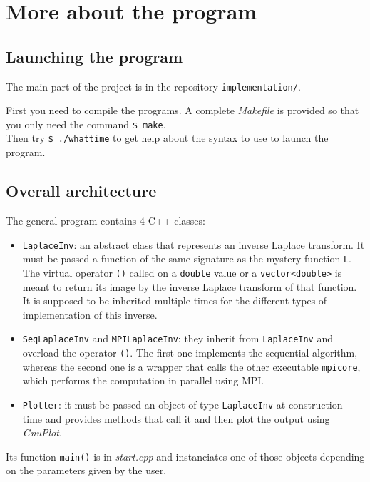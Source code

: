 \documentclass[11pt,a4paper]{article}
\begin{document}
\section*{More about the program}

\subsection*{Launching the program}

The main part of the project is in the repository \verb_implementation/_.

First you need to compile the programs. A complete \textit{Makefile} is provided so that you only need the command \verb_$ make_.\\

Then try \verb_$ ./whattime_ to get help about the syntax to use to launch the program.

\subsection*{Overall architecture}

The general program contains 4 C++ classes:
\begin{itemize}
  \item \verb_LaplaceInv_: an abstract class that represents an inverse Laplace transform. It must be passed a function of the same signature as the mystery function \verb_L_. The virtual operator \verb_()_ called on a \verb_double_ value or a \verb_vector<double>_ is meant to return its image by the inverse Laplace transform of that function. It is supposed to be inherited multiple times for the different types of implementation of this inverse.
  \item \verb_SeqLaplaceInv_ and \verb_MPILaplaceInv_: they inherit from \verb_LaplaceInv_ and overload the operator \verb_()_. The first one implements the sequential algorithm, whereas the second one is a wrapper that calls the other executable \verb_mpicore_, which performs the computation in parallel using MPI.
  \item \verb_Plotter_: it must be passed an object of type \verb_LaplaceInv_ at construction time and provides methods that call it and then plot the output using \textit{GnuPlot}.
\end{itemize}
Its function \verb_main()_ is in \textit{start.cpp} and instanciates one of those objects depending on the parameters given by the user.
\end{document}
